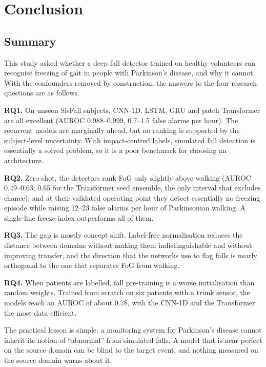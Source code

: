 \chapter{Conclusion}
\label{ch:conclusion}

\section{Summary}

This study asked whether a deep fall detector trained on healthy volunteers can recognise freezing of
gait in people with Parkinson's disease, and why it cannot. With the confounders removed by
construction, the answers to the four research questions are as follows.

\textbf{RQ1.} On unseen SisFall subjects, CNN-1D, LSTM, GRU and patch Transformer are all excellent
(AUROC 0.988--0.999, 0.7--1.5 false alarms per hour). The recurrent models are marginally ahead,
but no ranking is supported by the subject-level uncertainty. With impact-centred labels, simulated fall
detection is essentially a solved problem, so it is a poor benchmark for choosing an architecture.

\textbf{RQ2.} Zero-shot, the detectors rank FoG only slightly above walking (AUROC 0.49--0.63; 0.65 for the
Transformer seed ensemble, the only interval that excludes chance), and at their validated operating
point they detect essentially no freezing episode while raising 12--23 false alarms per hour of
Parkinsonian walking. A single-line freeze index outperforms all of them.

\textbf{RQ3.} The gap is mostly concept shift. Label-free normalisation reduces the distance between
domains without making them indistinguishable and without improving transfer, and the direction that
the networks use to flag falls is nearly orthogonal to the one that separates FoG from walking.

\textbf{RQ4.} When patients are labelled, fall pre-training is a worse initialisation than random
weights. Trained from scratch on six patients with a trunk sensor, the models reach an AUROC of about
0.78, with the CNN-1D and the Transformer the most data-efficient.

The practical lesson is simple: a monitoring system for Parkinson's disease cannot inherit its notion
of ``abnormal'' from simulated falls. A model that is near-perfect on the source domain can be blind
to the target event, and nothing measured on the source domain warns about it.

